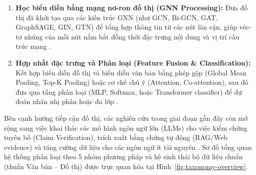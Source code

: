 \documentclass[11pt,a4paper]{extreport}
\begin{document}
\begin{enumerate}
\begin{itemize}
    \end{itemize}
    \item \textbf{Học biểu diễn bằng mạng nơ-ron đồ thị (GNN Processing):} Đưa đồ thị đã khởi tạo qua các kiến trúc GNN (như GCN, Bi-GCN, GAT, GraphSAGE, GIN, GTN) để tổng hợp thông tin từ các nút lân cận, giúp véc-tơ nhúng của mỗi nút nắm bắt đồng thời đặc trưng nội dung và vị trí cấu trúc mạng \cite{noauthor_disinformation_2024, noauthor_co-attention_2025}.
    \item \textbf{Hợp nhất đặc trưng và Phân loại (Feature Fusion \& Classification):} Kết hợp biểu diễn đồ thị và biểu diễn văn bản bằng phép gộp (Global Mean Pooling, Top-K Pooling) hoặc cơ chế chú ý (Attention, Co-attention), sau đó đưa qua tầng phân loại (MLP, Softmax, hoặc Transformer classifier) để dự đoán nhãn nhị phân hoặc đa lớp \cite{noauthor_exploiting_2024, noauthor_dual_2025, noauthor_co-attention_2025}.
\end{enumerate}

Bên cạnh hướng tiếp cận đồ thị, các nghiên cứu trong giai đoạn gần đây còn mở rộng sang việc khai thác các mô hình ngôn ngữ lớn (LLMs) cho việc kiểm chứng tuyên bố (Claim Verification), trích xuất bằng chứng tự động (RAG/Web evidence) và tăng cường dữ liệu cho các ngôn ngữ ít tài nguyên \cite{noauthor_addressing_2025, noauthor_semantic_2025-1, noauthor_systematic_2025}. Sơ đồ tổng quan hệ thống phân loại theo 5 nhóm phương pháp và hệ sinh thái bộ dữ liệu chuẩn (thuần Văn bản -- Đồ thị) được trực quan hóa tại Hình~\ref{fig:taxonomy-overview}.
\end{document}
